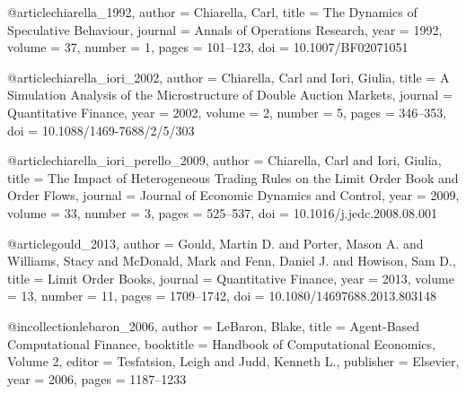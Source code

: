 @article{chiarella_1992,
  author  = {Chiarella, Carl},
  title   = {The Dynamics of Speculative Behaviour},
  journal = {Annals of Operations Research},
  year    = {1992}, volume = {37}, number = {1}, pages = {101--123},
  doi     = {10.1007/BF02071051}
}


@article{chiarella_iori_2002,
  author  = {Chiarella, Carl and Iori, Giulia},
  title   = {A Simulation Analysis of the Microstructure of Double Auction Markets},
  journal = {Quantitative Finance},
  year    = {2002}, volume = {2}, number = {5}, pages = {346--353},
  doi     = {10.1088/1469-7688/2/5/303}
}


@article{chiarella_iori_perello_2009,
  author  = {Chiarella, Carl and Iori, Giulia},
  title   = {The Impact of Heterogeneous Trading Rules on the Limit Order Book and Order Flows},
  journal = {Journal of Economic Dynamics and Control},
  year    = {2009}, volume = {33}, number = {3}, pages = {525--537},
  doi     = {10.1016/j.jedc.2008.08.001}
}


@article{gould_2013,
  author  = {Gould, Martin D. and Porter, Mason A. and Williams, Stacy and McDonald, Mark and Fenn, Daniel J. and Howison, Sam D.},
  title   = {Limit Order Books},
  journal = {Quantitative Finance},
  year    = {2013}, volume = {13}, number = {11}, pages = {1709--1742},
  doi     = {10.1080/14697688.2013.803148}
}


@incollection{lebaron_2006,
  author    = {LeBaron, Blake},
  title     = {Agent-Based Computational Finance},
  booktitle = {Handbook of Computational Economics, Volume 2},
  editor    = {Tesfatsion, Leigh and Judd, Kenneth L.},
  publisher = {Elsevier}, year = {2006}, pages = {1187--1233}
}


